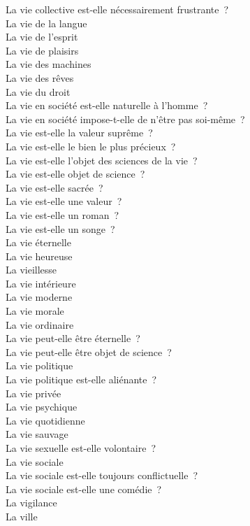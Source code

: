\documentclass[a4paper,12pt]{article}
\begin{document}
La vie collective est-elle nécessairement frustrante ? \\
La vie de la langue \\
La vie de l'esprit \\
La vie de plaisirs \\
La vie des machines \\
La vie des rêves \\
La vie du droit \\
La vie en société est-elle naturelle à l'homme ? \\
La vie en société impose-t-elle de n'être pas soi-même ? \\
La vie est-elle la valeur suprême ? \\
La vie est-elle le bien le plus précieux ? \\
La vie est-elle l'objet des sciences de la vie ? \\
La vie est-elle objet de science ? \\
La vie est-elle sacrée ? \\
La vie est-elle une valeur ? \\
La vie est-elle un roman ? \\
La vie est-elle un songe ? \\
La vie éternelle \\
La vie heureuse \\
La vieillesse \\
La vie intérieure \\
La vie moderne \\
La vie morale \\
La vie ordinaire \\
La vie peut-elle être éternelle ? \\
La vie peut-elle être objet de science ? \\
La vie politique \\
La vie politique est-elle aliénante ? \\
La vie privée \\
La vie psychique \\
La vie quotidienne \\
La vie sauvage \\
La vie sexuelle est-elle volontaire ? \\
La vie sociale \\
La vie sociale est-elle toujours conflictuelle ? \\
La vie sociale est-elle une comédie ? \\
La vigilance \\
La ville \\
\end{document}
